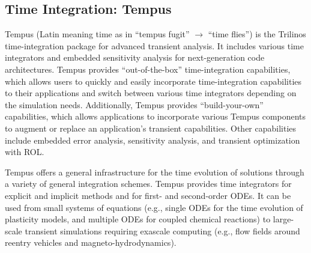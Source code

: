 \subsection{Time Integration: Tempus}
Tempus (Latin meaning time as in ``tempus fugit'' $\rightarrow$ ``time flies'') is the Trilinos time-integration package for advanced transient
analysis.  It includes various time integrators and embedded
sensitivity analysis for next-generation code architectures.  Tempus
provides “out-of-the-box” time-integration capabilities, which
allows users to quickly and easily incorporate time-integration
capabilities to their applications and switch between various time
integrators depending on the simulation needs.  Additionally, Tempus
provides “build-your-own” capabilities, which allows applications
to incorporate various Tempus components to augment or replace
an application's transient capabilities. Other capabilities include
embedded error analysis, sensitivity analysis, and transient optimization
with ROL.

Tempus offers a general infrastructure for the time evolution of
solutions through a variety of general integration schemes.  Tempus
provides time integrators for explicit and implicit methods and for
first- and second-order ODEs.  It can be used from small systems of
equations (e.g., single ODEs for the time evolution of plasticity
models, and multiple ODEs for coupled chemical reactions) to
large-scale transient simulations requiring exascale computing
(e.g., flow fields around reentry vehicles and magneto-hydrodynamics).

